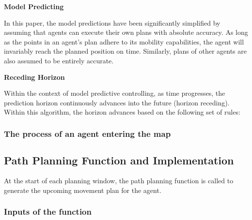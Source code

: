 \textbf{Model Predicting}

In this paper, the model predictions have been significantly simplified by assuming that agents can execute their own plans with absolute accuracy.
As long as the points in an agent's plan adhere to its mobility capabilities, the agent will invariably reach the planned position on time. Similarly, plans of other agents are also assumed to be entirely accurate.


\textbf{Receding Horizon}

Within the context of model predictive controlling, as time progresses, the prediction horizon continuously advances into the future (horizon receding).
Within this algorithm, the horizon advances based on the following set of rules:


\subsubsection{The process of an agent entering the map}

    



\subsection{Path Planning Function and Implementation}

At the start of each planning window, the path planning function is called to generate the upcoming movement plan for the agent.

\subsubsection{Inputs of the function}

